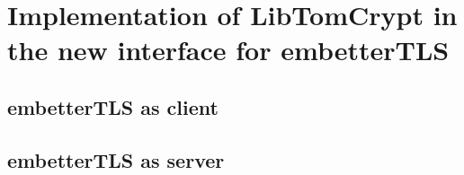 \chapter{Implementation of LibTomCrypt in the new interface for embetterTLS}

\section{embetterTLS as client}

\section{embetterTLS as server}